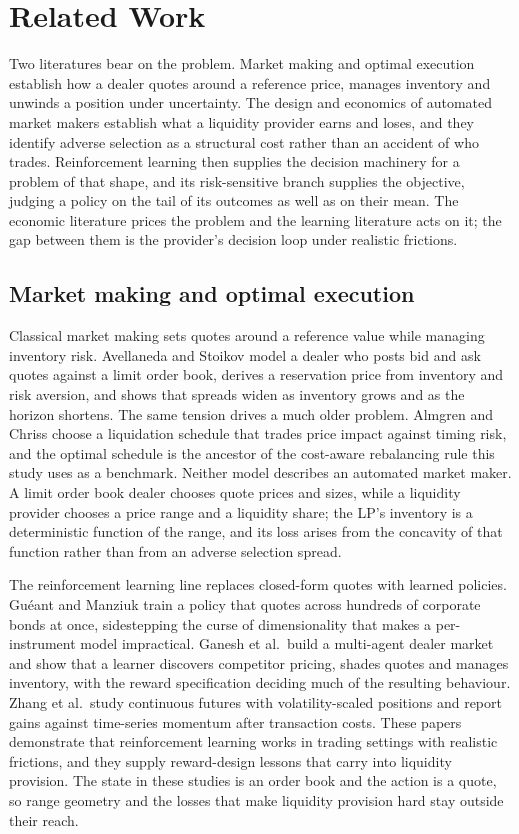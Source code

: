 \section{Related Work}
\label{sec:related}

Two literatures bear on the problem. Market making and optimal
execution establish how a dealer quotes around a reference price, manages
inventory and unwinds a position under uncertainty. The design and economics of
automated market makers establish what a liquidity provider earns and loses,
and they identify adverse selection as a structural cost rather than an
accident of who trades. Reinforcement learning then supplies the decision
machinery for a problem of that shape, and its risk-sensitive branch supplies
the objective, judging a policy on the tail of its outcomes as well as on their
mean. The economic
literature prices the problem and the learning literature acts on it; the gap
between them is the provider's decision loop under realistic frictions.

\subsection{Market making and optimal execution}

Classical market making sets quotes around a reference value while managing
inventory risk. Avellaneda and Stoikov model a dealer who posts bid and ask
quotes against a limit order book, derives a reservation price from inventory
and risk aversion, and shows that spreads widen as inventory grows and as the
horizon shortens\cite{avellaneda2008high}. The same tension drives a much older
problem. Almgren and Chriss choose a liquidation schedule that trades price
impact against timing risk, and the optimal schedule is the ancestor of the
cost-aware rebalancing rule this study uses as a benchmark\cite{almgren2001optimal}.
Neither model describes an automated market maker. A limit order book dealer
chooses quote prices and sizes, while a liquidity provider chooses a price
range and a liquidity share; the LP's inventory is a deterministic function of
the range, and its loss arises from the concavity of that function rather than
from an adverse selection spread.

The reinforcement learning line replaces closed-form quotes with learned
policies. Gu\'eant and Manziuk train a policy that quotes across hundreds of
corporate bonds at once, sidestepping the curse of dimensionality that makes a
per-instrument model impractical\cite{gueant2019deep}. Ganesh et al.\ build a
multi-agent dealer market and show that a learner discovers competitor pricing,
shades quotes and manages inventory, with the reward specification deciding
much of the resulting behaviour\cite{ganesh2019reinforcement}. Zhang et al.\
study continuous futures with volatility-scaled positions and report gains
against time-series momentum after transaction costs\cite{zhang2019deep}.
These papers demonstrate that reinforcement learning works in trading settings
with realistic frictions, and they supply reward-design lessons that carry into
liquidity provision. The state in these studies is an order book and the action
is a quote, so range geometry and the losses that make liquidity provision
hard stay outside their reach.

